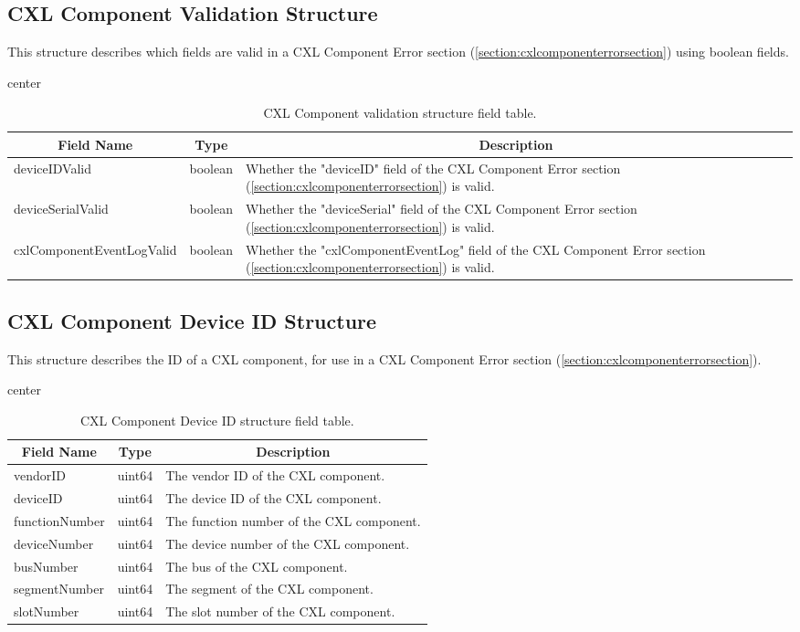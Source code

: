 \documentclass{report}
\newcommand*{\thead}[1]{\multicolumn{1}{|c|}{\bfseries #1}}
\newcommand*{\jsontable}[1]{
    \begin{table}[!ht]
    \label{#1}
    \centering
    \begin{adjustbox}{center}
    \begin{tabular}{|l|c|p{8cm}|}
    \hline
    \thead{Field Name} & \thead{Type} & \thead{Description} \\
    \hline
}
\newcommand*{\jsontableend}[1]{
    \hline
    \end{tabular}
    \end{adjustbox}
    \caption{#1}
    \label{table:#1}
    \end{table}
    \FloatBarrier
}
\begin{document}
\subsection{CXL Component Validation Structure}
\label{subsection:cxlcomponentvalidationstructure}
This structure describes which fields are valid in a CXL Component Error section (\ref{section:cxlcomponenterrorsection}) using boolean fields.
\jsontable{table:cxlcomponentvalidationstructure}
deviceIDValid & boolean & Whether the "deviceID" field of the CXL Component Error section (\ref{section:cxlcomponenterrorsection}) is valid.\\
\hline
deviceSerialValid & boolean & Whether the "deviceSerial" field of the CXL Component Error section (\ref{section:cxlcomponenterrorsection}) is valid.\\
\hline
cxlComponentEventLogValid & boolean & Whether the "cxlComponentEventLog" field of the CXL Component Error section (\ref{section:cxlcomponenterrorsection}) is valid.\\
\jsontableend{CXL Component validation structure field table.}

\subsection{CXL Component Device ID Structure}
\label{subsection:cxlcomponentdeviceidstructure}
This structure describes the ID of a CXL component, for use in a CXL Component Error section (\ref{section:cxlcomponenterrorsection}).
\jsontable{table:cxlcomponentdeviceidstructure}
vendorID & uint64 & The vendor ID of the CXL component.\\
\hline
deviceID & uint64 & The device ID of the CXL component.\\
\hline
functionNumber & uint64 & The function number of the CXL component.\\
\hline
deviceNumber & uint64 & The device number of the CXL component.\\
\hline
busNumber & uint64 & The bus of the CXL component.\\
\hline
segmentNumber & uint64 & The segment of the CXL component.\\
\hline
slotNumber & uint64 & The slot number of the CXL component.\\
\jsontableend{CXL Component Device ID structure field table.}
\end{document}
